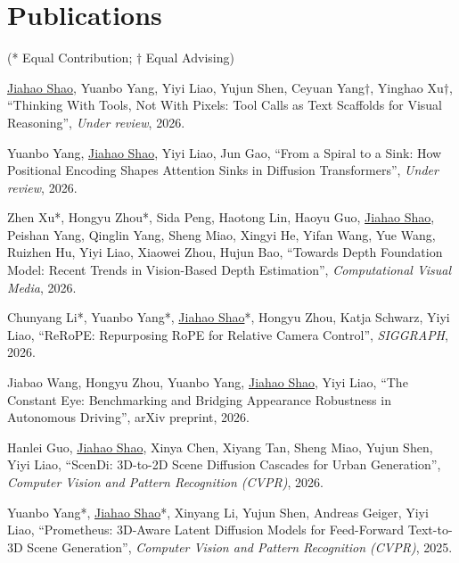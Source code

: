 \documentclass[11pt]{article}
\newcommand{\me}[1]{\underline{#1}}
\begin{document}
\section*{Publications}

(* Equal Contribution; $\dagger$ Equal Advising)

\begin{enumerate}[label={[\arabic*]},leftmargin=*,itemsep=4pt]
  \item \me{Jiahao Shao}, Yuanbo Yang, Yiyi Liao, Yujun Shen, Ceyuan Yang$\dagger$, Yinghao Xu$\dagger$,
  ``Thinking With Tools, Not With Pixels: Tool Calls as Text Scaffolds for Visual Reasoning'',
  \textit{Under review}, 2026.

  \item Yuanbo Yang, \me{Jiahao Shao}, Yiyi Liao, Jun Gao,
  ``From a Spiral to a Sink: How Positional Encoding Shapes Attention Sinks in Diffusion Transformers'',
  \textit{Under review}, 2026.

  \item Zhen Xu*, Hongyu Zhou*, Sida Peng, Haotong Lin, Haoyu Guo, \me{Jiahao Shao}, Peishan Yang, Qinglin Yang, Sheng Miao, Xingyi He, Yifan Wang, Yue Wang, Ruizhen Hu, Yiyi Liao, Xiaowei Zhou, Hujun Bao,
  ``Towards Depth Foundation Model: Recent Trends in Vision-Based Depth Estimation'',
  \textit{Computational Visual Media}, 2026.

  \item Chunyang Li*, Yuanbo Yang*, \me{Jiahao Shao}*, Hongyu Zhou, Katja Schwarz, Yiyi Liao,
  ``ReRoPE: Repurposing RoPE for Relative Camera Control'',
  \textit{SIGGRAPH}, 2026.

  \item Jiabao Wang, Hongyu Zhou, Yuanbo Yang, \me{Jiahao Shao}, Yiyi Liao,
  ``The Constant Eye: Benchmarking and Bridging Appearance Robustness in Autonomous Driving'',
  arXiv preprint, 2026.

  \item Hanlei Guo, \me{Jiahao Shao}, Xinya Chen, Xiyang Tan, Sheng Miao, Yujun Shen, Yiyi Liao,
  ``ScenDi: 3D-to-2D Scene Diffusion Cascades for Urban Generation'',
  \textit{Computer Vision and Pattern Recognition (CVPR)}, 2026.

  \item Yuanbo Yang*, \me{Jiahao Shao}*, Xinyang Li, Yujun Shen, Andreas Geiger, Yiyi Liao,
  ``Prometheus: 3D-Aware Latent Diffusion Models for Feed-Forward Text-to-3D Scene Generation'',
  \textit{Computer Vision and Pattern Recognition (CVPR)}, 2025.


\end{enumerate}
\end{document}
